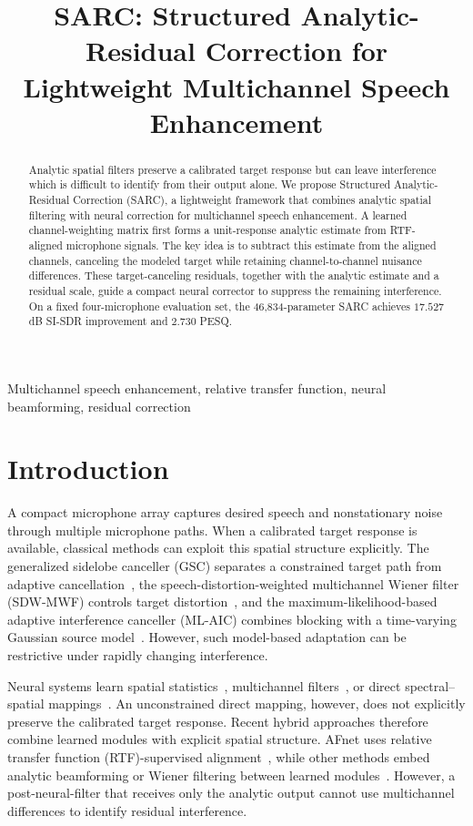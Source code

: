\documentclass{article}
\title{SARC: Structured Analytic-Residual Correction for \\Lightweight Multichannel Speech Enhancement}
\begin{document}
%
\maketitle
%
\begin{abstract}
Analytic spatial filters preserve a calibrated target response but can leave interference which is difficult to identify from their output alone.
We propose Structured Analytic-Residual Correction (SARC), a lightweight framework that combines analytic spatial filtering with neural correction
for multichannel speech enhancement.
A learned channel-weighting matrix
first forms a unit-response analytic estimate from RTF-aligned microphone
signals. The key idea is to subtract this estimate from the aligned
channels, canceling the modeled target while retaining channel-to-channel
nuisance differences. These target-canceling residuals, together with the
analytic estimate and a residual scale, guide a compact neural corrector
to suppress the remaining interference.
On a fixed four-microphone evaluation set, the 46,834-parameter SARC achieves
$17.527$ dB SI-SDR improvement and $2.730$ PESQ.
\end{abstract}
%
\begin{keywords}
Multichannel speech enhancement, relative transfer function, neural beamforming, residual correction
\end{keywords}
%
\section{Introduction}
\label{sec:intro}

A compact microphone array captures desired speech and nonstationary
noise through multiple microphone paths. When a calibrated target
response is available, classical methods can exploit this spatial
structure explicitly. The generalized sidelobe canceller (GSC)
separates a constrained target path from adaptive
cancellation~\cite{griffiths1982gsc,hoshuyama1999robust}, the
speech-distortion-weighted multichannel Wiener filter (SDW-MWF)
controls target distortion~\cite{spriet2004sdwmwf}, and the
maximum-likelihood-based adaptive interference canceller (ML-AIC)
combines blocking with a time-varying Gaussian source
model~\cite{wang2023mlaic}. However, such model-based adaptation can
be restrictive under rapidly changing interference.

Neural systems learn spatial statistics~\cite{casebeer2021nice},
multichannel filters~\cite{li2022eabnet}, or direct spectral--spatial
mappings~\cite{yang2023mcnet}. An unconstrained direct mapping,
however, does not explicitly preserve the calibrated target response.
Recent hybrid approaches therefore combine learned modules with
explicit spatial structure. AFnet uses relative transfer function
(RTF)-supervised alignment~\cite{lee2025afnet}, while other methods
embed analytic beamforming or Wiener filtering between learned
modules~\cite{lee2024mvdrunet,hsieh2024nwf,cheong2025ideeppe}.
However, a post-neural-filter that receives only the analytic output cannot use
multichannel differences to identify residual interference.
\end{document}
